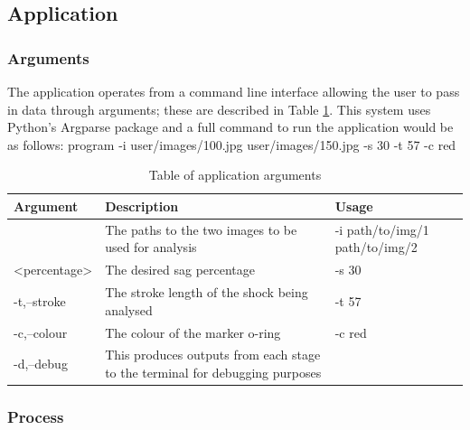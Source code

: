 \subsection{Application}
	\subsubsection{Arguments}
		The application operates from a command line interface allowing the user to pass in data through arguments; these are described in Table \ref{tab:arguments}. This system uses Python's Argparse package and a full command to run the application would be as follows:
		{\centering \ttfamily program -i user/images/100.jpg user/images/150.jpg -s 30 -t 57 -c red}
		\begin{table}[h!]
			\centering
			\caption{Table of application arguments}
			\label{tab:arguments}
			\begin{tabular}{|l|p{}|p{}|}
			\hline
			\bfseries Argument&\bfseries Description&\bfseries Usage\\
			\hline
			{\ttfamily [-i,--image]<path1 path2>}&The paths to the two images to be used for analysis&{\ttfamily -i path/to/img/1 path/to/img/2}\\
			{\ttfamily [-s,--sag]<percentage>}&The desired sag percentage&{\ttfamily -s 30}\\
			{\ttfamily -t,--stroke}&The stroke length of the shock being analysed&{\ttfamily -t 57}\\
			{\ttfamily -c,--colour}&The colour of the marker o-ring&{\ttfamily -c red}\\
			{\ttfamily -d,--debug}&This produces outputs from each stage to the terminal for debugging purposes&\\
			\hline
			\end{tabular}
		\end{table}
	\subsubsection{Process}
